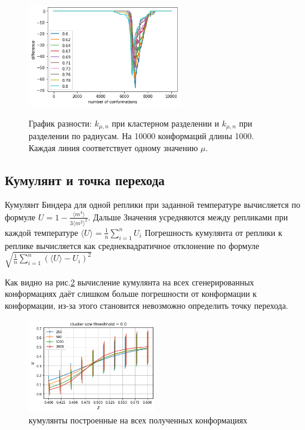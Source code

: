 \begin{figure}[h]
	\centering
	\includegraphics[width=0.6\textwidth]{../images/radius_and_cluster_comparising_L1000.png}
	\label{fig:kmun_dif}
	\caption{График разности: $k_{\mu, n}$ при кластерном разделении и $k_{\mu, n}$ при разделении по радиусам. На 10000 конформаций длины 1000. Каждая линия соответствует одному значению $\mu$.}
\end{figure}



\subsection{Кумулянт и точка перехода}

Кумулянт Биндера для одной реплики при заданной температуре вычисляется по формуле $U = 1 - \frac{\langle m^4\rangle}{3\langle m^2\rangle ^2}$. Дальше Значения усредняются между репликами при каждой температуре $\langle U\rangle = \frac{1}{n}\sum_{i=1}^{n}U_i$ 
Погрешность кумулянта от реплики к реплике вычисляется как среднеквадратичное отклонение по формуле $\sqrt{\frac{1}{n}\sum_{i=1}^{n}(\langle U\rangle - U_i)^2}$

Как видно на рис.\ref{fig:cumulant_raw} вычисление кумулянта на всех сгенерированных конформациях даёт слишком больше погрешности от конформации к конформации, из-за этого становится невозможно определить точку перехода.

\begin{figure}[h]
	\centering
	\includegraphics[width=0.5\textwidth]{../images/Cumulant_raw_beta0.4_0.6.png}
	\caption{кумулянты построенные на всех полученных конформациях}
	\label{fig:cumulant_raw}
\end{figure}

